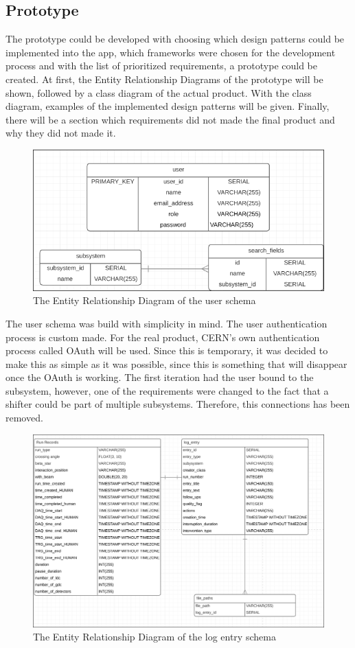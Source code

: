 \documentclass[paper=a4, fontsize=11pt,twoside]{scrartcl}	%
\begin{document}
\subsection{Prototype}
The prototype could be developed with choosing which design patterns could be implemented into the app, which frameworks were chosen for the development process and with the list of prioritized requirements, a prototype could be created.  At first, the Entity Relationship Diagrams of the prototype will be shown, followed by a class diagram of the actual product. With the class diagram, examples of the implemented design patterns will be given. Finally, there will be a section which 
requirements did not made the final product and why they did not made it.
\noindent
\begin{figure}[H]
\centering
\includegraphics[scale=0.5]{erd_user}
\caption{The Entity Relationship Diagram of the user schema}
\end{figure}
\noindent
The user schema was build with simplicity in mind. The user authentication process is custom made. For the real product, CERN's own authentication process called OAuth will be used. Since this is temporary, it was decided to make this as simple as it was possible, since this is something that will disappear once the OAuth is working. The first iteration had the user bound to the subsystem, however, one of the requirements were changed to the fact that a shifter could be part of multiple subsystems. Therefore, this connections has been removed.
\begin{figure}[H]
\includegraphics[scale=0.4]{erd_log_entry}
\caption{The Entity Relationship Diagram of the log entry schema}
\end{figure}
\end{document}
